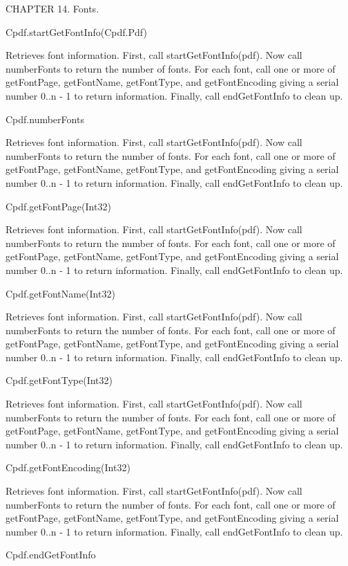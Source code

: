 CHAPTER 14. Fonts.

Cpdf.startGetFontInfo(Cpdf.Pdf)


Retrieves font information. First, call startGetFontInfo(pdf). Now
call numberFonts to return the number of fonts. For each font, call
one or more of getFontPage, getFontName, getFontType, and
getFontEncoding giving a serial number 0..n - 1 to
return information. Finally, call endGetFontInfo to clean up.


Cpdf.numberFonts


Retrieves font information. First, call startGetFontInfo(pdf). Now
call numberFonts to return the number of fonts. For each font, call
one or more of getFontPage, getFontName, getFontType, and
getFontEncoding giving a serial number 0..n - 1 to
return information. Finally, call endGetFontInfo to clean up.


Cpdf.getFontPage(Int32)


Retrieves font information. First, call startGetFontInfo(pdf). Now
call numberFonts to return the number of fonts. For each font, call
one or more of getFontPage, getFontName, getFontType, and
getFontEncoding giving a serial number 0..n - 1 to
return information. Finally, call endGetFontInfo to clean up.


Cpdf.getFontName(Int32)


Retrieves font information. First, call startGetFontInfo(pdf). Now
call numberFonts to return the number of fonts. For each font, call
one or more of getFontPage, getFontName, getFontType, and
getFontEncoding giving a serial number 0..n - 1 to
return information. Finally, call endGetFontInfo to clean up.


Cpdf.getFontType(Int32)


Retrieves font information. First, call startGetFontInfo(pdf). Now
call numberFonts to return the number of fonts. For each font, call
one or more of getFontPage, getFontName, getFontType, and
getFontEncoding giving a serial number 0..n - 1 to
return information. Finally, call endGetFontInfo to clean up.


Cpdf.getFontEncoding(Int32)


Retrieves font information. First, call startGetFontInfo(pdf). Now
call numberFonts to return the number of fonts. For each font, call
one or more of getFontPage, getFontName, getFontType, and
getFontEncoding giving a serial number 0..n - 1 to
return information. Finally, call endGetFontInfo to clean up.


Cpdf.endGetFontInfo


